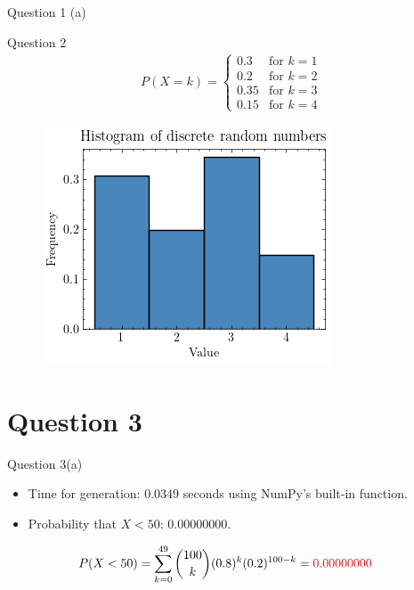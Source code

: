 \documentclass[compress,12pt]{beamer}
\begin{document}
\begin{frame}{Question 1 (a)}
\begin{frame}{Question 2}
\begin{align*}
      P(X = k) = \begin{cases}
            0.3 & \text{for } k = 1 \\
            0.2 & \text{for } k = 2 \\
            0.35 & \text{for } k = 3 \\
            0.15 & \text{for } k = 4
      \end{cases}
\end{align*}

      \begin{figure}
            \centering
            \includegraphics[scale=0.6]{imgs/discrete.png}
      \end{figure}
      
\end{frame}

\section{Question 3}
\begin{frame}{Question 3(a)}
     \begin{itemize}
         \item Time for generation: $0.0349$ seconds using NumPy's built-in function.
         \item Probability that $X < 50$: $0.00000000$.
     \end{itemize}
        \begin{align*}
                P(X < 50) &= \sum_{k=0}^{49} {100 \choose k} (0.8)^k (0.2)^{100-k} = {\color{red}0.00000000}
        \end{align*}
      
\end{frame}


\end{frame}
\end{document}
